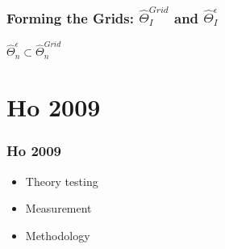 \documentclass[notes=show]{beamer}
\begin{document}

\begin{frame}
\frametitle{Forming the Grids: $\widehat{\Theta}_{I}^{Grid}$ and
$\widehat{\Theta}_{I}^{\epsilon}$}

$\widehat{\Theta }_{n}^{\epsilon }\subset \widehat{\Theta }_{n}^{Grid}$

\begin{figure}[h!]
\begin{center}
\end{center}
\end{figure}
\end{frame}

\section{Ho 2009}

\begin{frame}
\frametitle{Ho 2009}

\begin{itemize}
	\item Theory testing
	\item Measurement
	\item Methodology
\end{itemize}
\end{frame}

\end{document}
